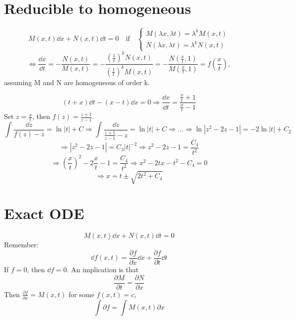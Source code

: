 \documentclass[twoside]{article}
\begin{document}

\section{Reducible to homogeneous} 
\begin{equation}
    M(x,t)\dd x + N(x,t)\dd t = 0 \quad \text{if} \quad \begin{cases}
        M(\lambda x,\lambda t) = \lambda^k M(x,t)\\
        N(\lambda x,\lambda t) = \lambda^k N(x,t)
    \end{cases}
\end{equation}
\begin{equation}
    \iff \frac{\dd x}{\dd t} = - \frac{N(x,t)}{M(x,t)} = - \frac{(\frac{1}{t})^k N(x,t)}{(\frac{1}{t})^kM(x,t)} = - \frac{N(\frac{x}{t},1)}{M(\frac{x}{t},1)} = f(\frac{x}{t}),
\end{equation}
assuming M and N are homogeneous of order k.

\begin{example}
    $$(t+x)\dd t - (x-t) \dd x = 0 \Longrightarrow \frac{\dd x}{\dd t} = \frac{\frac{x}{t}+1}{\frac{x}{t}-1}$$
    Set $ z = \frac{x}{t}$, then $f(z) = \frac{z+1}{z-1}$.
    \[
    \int \frac{\dd z}{f(z)-z} = \ln |t| + C \Longrightarrow \int \frac{\dd z}{\frac{z+1}{z-1}-z} = \ln |t| + C \Longrightarrow \dots \Longrightarrow \ln |z^2-2z-1| = -2 \ln |t| + C_2
    \]
    \[
    \Longrightarrow |z^2-2z-1| = C_3 |t|^{-2} \Longrightarrow z^2-2z-1 = \frac{C_4}{ t^{2}}
    \]
    \[
    \Longrightarrow (\frac{x}{t})^2 - 2\frac{x}{t} - 1 = \frac{C_4}{ t^{2}} \Longrightarrow x^2 - 2tx - t^2 - C_4 = 0
    \]
    \[
    \Longrightarrow 
    x = t \pm \sqrt{2t^2+C_4}
    \]
\end{example}

\section{Exact ODE}
\begin{equation}
     M(x,t)\dd x + N(x,t)\dd t = 0
\end{equation}
Remember:
\[
    \dd f(x,t) = \frac{\partial f}{\partial x}\dd x + \frac{\partial f}{\partial t}\dd t
\]
If $f = 0$, then $\dd f = 0$. An implication is that
\[
    \frac{\partial M}{\partial t} = \frac{\partial N}{\partial x}
\]
Then $\frac{\partial f}{\partial x} = M(x,t)$ for some $f(x,t) = c$,
\[
    \int \partial f = \int M(x,t) \partial x
\]
\end{document}
